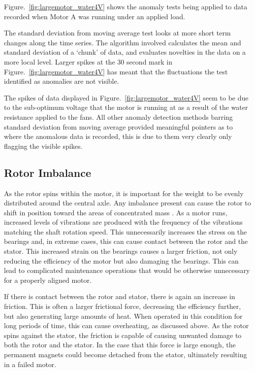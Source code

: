 Figure.~\ref{fig:largemotor_water4V} shows the anomaly tests being applied to data recorded when Motor A was running under an applied load.

The standard deviation from moving average test looks at more short term changes along the time series. The algorithm involved calculates the mean and standard deviation of a `chunk' of data, and evaluates novelties in the data on a more local level. Larger spikes at the 30 second mark in Figure.~\ref{fig:largemotor_water4V} has meant that the fluctuations the test identified as anomalies are not visible.

The spikes of data displayed in Figure.~\ref{fig:largemotor_water4V} seem to be due to the sub-optimum voltage that the motor is running at as a result of the water resistance applied to the fans. All other anomaly detection methods barring standard deviation from moving average provided meaningful pointers as to where the anomalous data is recorded, this is due to them very clearly only flagging the visible spikes.




\subsection{Rotor Imbalance}
As the rotor spins within the motor, it is important for the weight to be evenly distributed around the central axle. Any imbalance present can cause the rotor to shift in position toward the areas of concentrated mass \cite{xu1994vibration}. As a motor runs, increased levels of vibrations are produced with the frequency of the vibrations matching the shaft rotation speed. This unnecessarily increases the stress on the bearings and, in extreme cases, this can cause contact between the rotor and the stator. This increased strain on the bearings causes a larger friction, not only reducing the efficiency of the motor but also damaging the bearings. This can lead to complicated maintenance operations that would be otherwise unnecessary for a properly aligned motor.

If there is contact between the rotor and stator, there is again an increase in friction. This is often a larger frictional force, decreasing the efficiency further, but also generating large amounts of heat. When operated in this condition for long periods of time, this can cause overheating, as discussed above. As the rotor spins against the stator, the friction is capable of causing unwanted damage to both the rotor and the stator. In the case that this force is large enough, the permanent magnets could become detached from the stator, ultimately resulting in a failed motor.

